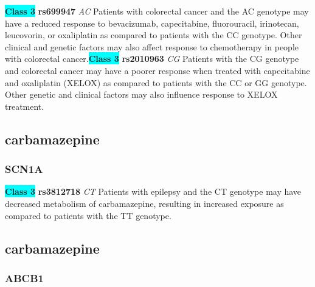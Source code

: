 \documentclass{book}
\begin{document}
\begin{center}
\textbf{\colorbox{cyan} {Class 3}} \textbf{ rs699947 } \textit{ AC }
Patients with colorectal cancer and the AC genotype may have a reduced response to bevacizumab, capecitabine, fluorouracil, irinotecan, leucovorin, or oxaliplatin as compared to patients with the CC genotype. Other clinical and genetic factors may also affect response to chemotherapy in people with colorectal cancer.\textbf{\colorbox{cyan} {Class 3}} \textbf{ rs2010963 } \textit{ CG }
Patients with the CG genotype and colorectal cancer may have a poorer response when treated with capecitabine and oxaliplatin (XELOX) as compared to patients with the CC or GG genotype. Other genetic and clinical factors may also influence response to XELOX treatment.


\end{center}\subsection{ carbamazepine }


\subsubsection{ SCN1A }

\begin{center}
\textbf{\colorbox{cyan} {Class 3}} \textbf{ rs3812718 } \textit{ CT }
Patients with epilepsy and the CT genotype may have decreased metabolism of carbamazepine, resulting in increased exposure as compared to patients with the TT genotype. 


\end{center}\subsection{ carbamazepine }


\subsubsection{ ABCB1 }
\end{document}
